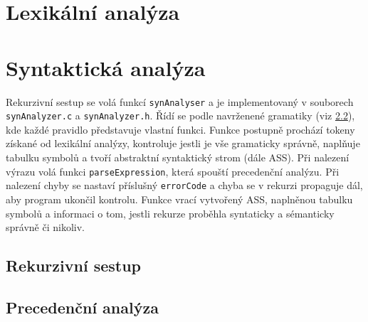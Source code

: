 \documentclass[a4paper, 12pt]{article}
\begin{document}
    \section{Lexikální analýza}

    \section{Syntaktická analýza}
    Rekurzivní sestup se volá funkcí \texttt{synAnalyser} a je implementovaný v souborech \texttt{synAnalyzer.c} a \texttt{synAnalyzer.h}. Řídí se podle navrženené gramatiky (viz \ref{}), kde každé pravidlo představuje vlastní funkci. Funkce postupně prochází tokeny získané od lexikální analýzy, kontroluje jestli je vše gramaticky správně, naplňuje tabulku symbolů a tvoří abstraktní syntaktický strom (dále ASS). Při nalezení výrazu volá funkci \texttt{parseExpression}, která spouští precedenční analýzu. Při nalezení chyby se nastaví příslušný \texttt{errorCode} a chyba se v rekurzi propaguje dál, aby program ukončil kontrolu. Funkce vrací vytvořený ASS, naplněnou tabulku symbolů a informaci o tom, jestli rekurze proběhla syntaticky a sémanticky správně či nikoliv.

    \subsection{Rekurzivní sestup}

    \subsection{Precedenční analýza}
\end{document}

